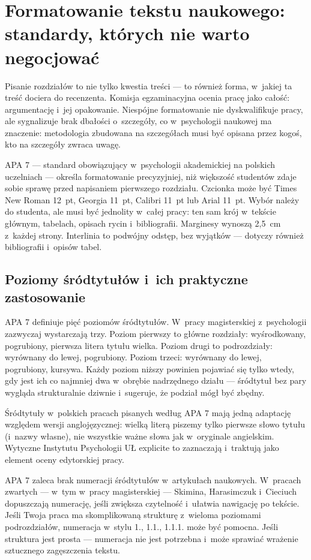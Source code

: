 \documentclass[12pt,a4paper,twoside,openany]{book}
\let\bforigsection\section
\renewcommand{\section}{\needspace{4\baselineskip}\bforigsection}
\begin{document}
\section{Formatowanie tekstu naukowego: standardy, których nie warto negocjować}

Pisanie rozdziałów to nie tylko kwestia treści --- to również forma, w~jakiej ta treść dociera do recenzenta. Komisja egzaminacyjna ocenia pracę jako całość: argumentację i~jej opakowanie. Niespójne formatowanie nie dyskwalifikuje pracy, ale sygnalizuje brak dbałości o~szczegóły, co w~psychologii naukowej ma znaczenie: metodologia zbudowana na szczegółach musi być opisana przez kogoś, kto na szczegóły zwraca uwagę.

APA 7 --- standard obowiązujący w~psychologii akademickiej na polskich uczelniach --- określa formatowanie precyzyjniej, niż większość studentów zdaje sobie sprawę przed napisaniem pierwszego rozdziału. Czcionka może być Times New Roman 12~pt, Georgia 11~pt, Calibri 11~pt lub Arial 11~pt. Wybór należy do studenta, ale musi być jednolity w~całej pracy: ten sam krój w~tekście głównym, tabelach, opisach rycin i~bibliografii. Marginesy wynoszą 2{,}5~cm z~każdej strony. Interlinia to podwójny odstęp, bez wyjątków --- dotyczy również bibliografii i~opisów tabel.

\subsection{Poziomy śródtytułów i~ich praktyczne zastosowanie}

APA 7 definiuje pięć poziomów śródtytułów. W~pracy magisterskiej z~psychologii zazwyczaj wystarczają trzy. Poziom pierwszy to główne rozdziały: wyśrodkowany, pogrubiony, pierwsza litera tytułu wielka. Poziom drugi to podrozdziały: wyrównany do lewej, pogrubiony. Poziom trzeci: wyrównany do lewej, pogrubiony, kursywa. Każdy poziom niższy powinien pojawiać się tylko wtedy, gdy jest ich co najmniej dwa w~obrębie nadrzędnego działu --- śródtytuł bez pary wygląda strukturalnie dziwnie i~sugeruje, że podział mógł być zbędny.

Śródtytuły w~polskich pracach pisanych według APA 7 mają jedną adaptację względem wersji anglojęzycznej: wielką literą piszemy tylko pierwsze słowo tytułu (i~nazwy własne), nie wszystkie ważne słowa jak w~oryginale angielskim. Wytyczne Instytutu Psychologii UŁ explicite to zaznaczają i~traktują jako element oceny edytorskiej pracy.

\begin{tipbox}
APA 7 zaleca brak numeracji śródtytułów w~artykułach naukowych. W~pracach zwartych --- w~tym w~pracy magisterskiej --- Skimina, Harasimczuk i~Cieciuch dopuszczają numerację, jeśli zwiększa czytelność i~ułatwia nawigację po tekście. Jeśli Twoja praca ma skomplikowaną strukturę z~wieloma poziomami podrozdziałów, numeracja w~stylu 1., 1.1., 1.1.1. może być pomocna. Jeśli struktura jest prosta --- numeracja nie jest potrzebna i~może sprawiać wrażenie sztucznego zagęszczenia tekstu.
\end{tipbox}
\end{document}
